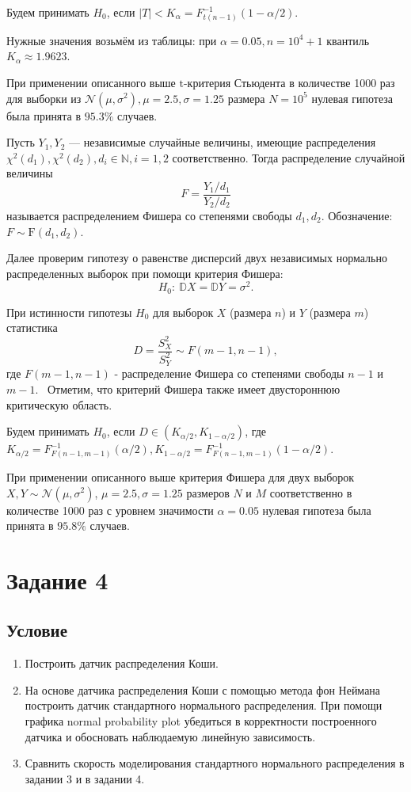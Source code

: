 \documentclass[11pt]{report}
\begin{document}
Будем принимать $H_0$, если $|T| < K_\alpha = F^{-1}_{t(n-1)}(1-\alpha/2)$.

Нужные значения возьмём из таблицы: при $\alpha=0.05, n=10^4 + 1$ квантиль $K_\alpha \approx 1.9623$.

При применении описанного выше $\mathrm{t}$-критерия Стьюдента в количестве 1000 раз для выборки из $\mathcal{N}(\mu,\sigma^2),\mu = 2.5,\sigma=1.25$ размера $N=10^5$ нулевая гипотеза была принята в $95.3\%$ случаев.

\begin{definition}
Пусть $Y_1,Y_2$ --- независимые случайные величины, имеющие распределения $\chi^2(d_1),\chi^2(d_2),d_i\in\mathbb{N},i=1,2$ соответственно.
Тогда распределение случайной величины
$$
F=\dfrac{Y_1/d_1}{Y_2/d_2}
$$
называется распределением Фишера со степенями свободы $d_1,d_2$. Обозначение: $F\sim\mathrm{F}(d_1,d_2)$.
\end{definition}

Далее проверим гипотезу о равенстве дисперсий двух независимых нормально распределенных выборок при помощи критерия Фишера:
$$
H_0:~ \mathbb{D}X = \mathbb{D}Y = \sigma^2.
$$

При истинности гипотезы $H_0$ для выборок $X$ (размера $n$) и $Y$ (размера $m$) статистика
$$
D = \dfrac{S^2_X}{S^2_Y} \sim F(m-1,n-1),
$$
где $F(m-1,n-1)$ - распределение Фишера со степенями свободы $n-1$ и $m-1$. \
Отметим, что критерий Фишера также имеет двустороннюю критическую область.

Будем принимать $H_0$, если $D\in (K_{\alpha/2}, K_{1-\alpha/2})$, где $K_{\alpha/2}=F^{-1}_{F(n-1,m-1)}(\alpha/2), K_{1-\alpha/2}=F^{-1}_{F(n-1,m-1)}(1-\alpha/2)$.

При применении описанного выше критерия Фишера для двух выборок \\
$X,Y\sim\mathcal{N}(\mu,\sigma^2)$,
$\mu=2.5,\sigma=1.25$ размеров $N$ и $M$ соответственно в количестве 1000 раз с уровнем значимости $\alpha=0.05$ нулевая гипотеза была принята в $95.8\%$ случаев.

\section{Задание 4}

\subsection{Условие}

\begin{enumerate}
\item Построить датчик распределения Коши.
\item На основе датчика распределения Коши с помощью метода фон Неймана построить датчик стандартного нормального распределения. При помощи 
графика normal probability plot убедиться в корректности построенного датчика и обосновать наблюдаемую линейную зависимость.
\item Сравнить скорость моделирования стандартного нормального распределения в задании 3 и в задании 4.
\end{enumerate}
\end{document}
